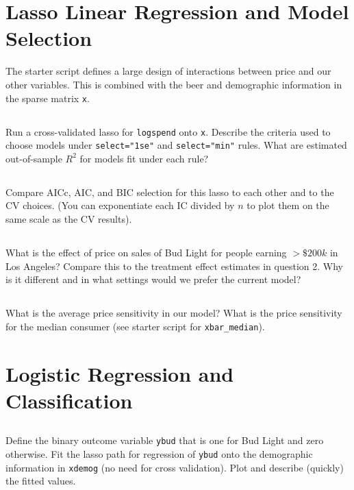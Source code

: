\documentclass[12pt]{article}
\begin{document}
 
\newpage
\section{Lasso Linear Regression and Model Selection}

The starter script defines a large design of interactions between price and our other variables.  This is combined with the beer and demographic information in the sparse matrix {\tt x}.

\subsection{}
Run a cross-validated lasso for {\tt logspend} onto {\tt x}.
Describe the criteria used to choose models under {\tt select="1se"} and {\tt select="min"} rules.  What are estimated out-of-sample $R^2$ for models fit under each rule?

\subsection{} Compare AICc, AIC, and BIC selection for this lasso to each other and to the CV choices.  (You can exponentiate each IC divided by $n$ to plot them on the same scale as the CV results).

\subsection{} What is the effect of price on sales of Bud Light for people earning $>\$200k$ in Los Angeles?  Compare this to the treatment effect estimates in question 2.  Why is it different and in what settings would we prefer the current model?

\subsection{} What is the average price sensitivity in our model?  What is the price sensitivity for the median consumer (see starter script for {\tt xbar\_median}).

\newpage
\section{Logistic Regression and Classification}


\subsection{}
Define the binary outcome variable {\tt ybud} that is one for Bud Light and zero otherwise.  Fit the lasso path for regression of {\tt ybud} onto the demographic information in {\tt xdemog}  (no need for cross validation). Plot and describe (quickly) the fitted values.
\end{document}
